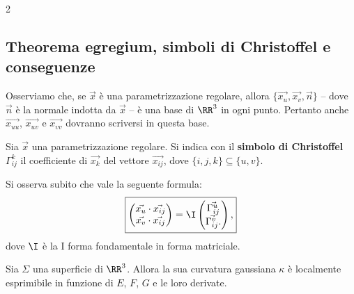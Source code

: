 \begin{multicols*}{2}
    \subsection{Theorema egregium, simboli di Christoffel e conseguenze}

    \begin{remark}
        Osserviamo che, se $\vec{x}$ è una parametrizzazione regolare,
        allora $\{\vec{x_u}, \vec{x_v}, \vec{n}\}$ -- dove $\vec{n}$ è la
        normale indotta da $\vec{x}$ -- è una base di $\RR^3$ in ogni punto.
        Pertanto anche $\vec{x_{uu}}$, $\vec{x_{uv}}$ e $\vec{x_{vv}}$ dovranno
        scriversi in questa base.
    \end{remark}

    \begin{definition}
        Sia $\vec{x}$ una parametrizzazione regolare. Si indica con
        il \textbf{simbolo di Christoffel} $\Gamma_{ij}^k$ il coefficiente di $\vec{x_k}$
        del vettore $\vec{x_{ij}}$, dove
        $\{i, j, k\} \subseteq \{u, v\}$.
    \end{definition}

    \begin{remark}
        Si osserva subito che vale la seguente formula:
        \[
            \boxed{\begin{pmatrix}
                    \vec{x_u} \cdot \vec{x_{ij}} \\
                    \vec{x_v} \cdot \vec{x_{ij}}
                \end{pmatrix} =
                \I \begin{pmatrix}
                    \vec{\Gamma_{ij}^u} \\
                    \vec{\Gamma_{ij}^v}.
                \end{pmatrix},}
        \]
        dove $\I$ è la I forma fondamentale in forma matriciale.
    \end{remark}

    \begin{theorem}
        Sia $\Sigma$ una superficie di $\RR^3$. Allora la sua
        curvatura gaussiana $\kappa$ è localmente esprimibile in funzione
        di $E$, $F$, $G$ e le loro derivate.
    \end{theorem}


\end{multicols*}

